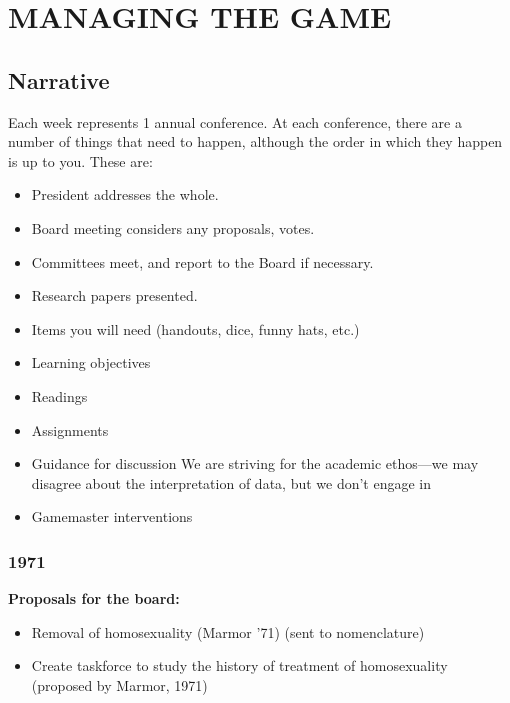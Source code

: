 \pagebreak 

\chapter{MANAGING THE GAME}
\label{managingthegame}

\section{Narrative}
\label{narrative}

Each week represents 1 annual conference. At each conference, there are a number of things that need to happen, although the order in which they happen is up to you. These are:

\begin{itemize}
\item President addresses the whole.

\item Board meeting considers any proposals, votes.

\item Committees meet, and report to the Board if necessary.

\item Research papers presented.

\item Items you will need (handouts, dice, funny hats, etc.)

\item Learning objectives

\item Readings

\item Assignments

\item Guidance for discussion
We are striving for the academic ethos---we may disagree about the interpretation of data, but we don't engage in 

\item Gamemaster interventions

\end{itemize}

\subsection{1971}
\label{1971}

\textbf{Proposals for the board:}

\begin{itemize}
\item Removal of homosexuality (Marmor '71) (sent to nomenclature)

\item Create taskforce to study the history of treatment of homosexuality (proposed by Marmor, 1971)

\end{itemize}

